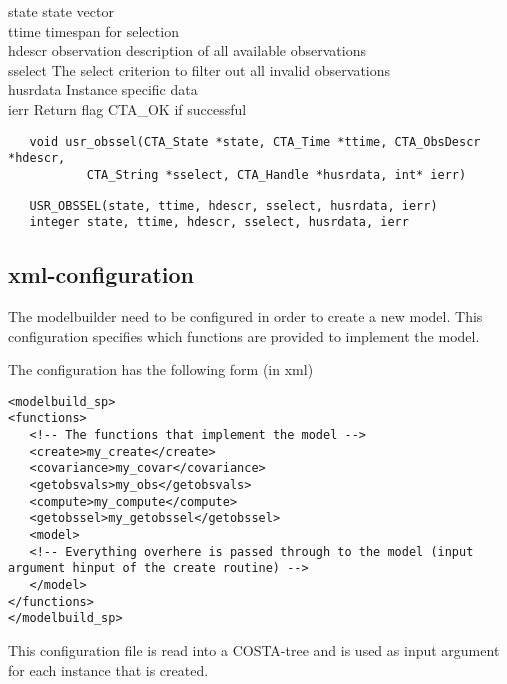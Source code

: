 \horzline
\begin{tabbing}
\functab
{}
 {state}  {state vector} \\
 {ttime}  {timespan for selection} \\
 {hdescr} {observation description of all available observations}  \\
 {sselect} {The select criterion to filter out all invalid observations}\\
 {husrdata}  {Instance specific data}\\
    {ierr}      {Return flag CTA\_OK if successful}\\
\end{tabbing}
\horzline

\begin{verbatim}
   void usr_obssel(CTA_State *state, CTA_Time *ttime, CTA_ObsDescr *hdescr,
           CTA_String *sselect, CTA_Handle *husrdata, int* ierr)
\end{verbatim}

\begin{verbatim}
   USR_OBSSEL(state, ttime, hdescr, sselect, husrdata, ierr)
   integer state, ttime, hdescr, sselect, husrdata, ierr
\end{verbatim}

\subsection{xml-configuration}
The modelbuilder need to be configured in order to create a new model. This
configuration specifies which functions
are provided to implement the model.

The configuration has the following form (in xml)
\begin{verbatim}
<modelbuild_sp> 
<functions>
   <!-- The functions that implement the model -->
   <create>my_create</create>
   <covariance>my_covar</covariance>
   <getobsvals>my_obs</getobsvals>
   <compute>my_compute</compute>
   <getobssel>my_getobssel</getobssel>
   <model>
   <!-- Everything overhere is passed through to the model (input argument hinput of the create routine) -->
   </model>
</functions>
</modelbuild_sp> 

\end{verbatim}
This configuration file is read into a COSTA-tree and is used as input
argument for each instance that is created.

